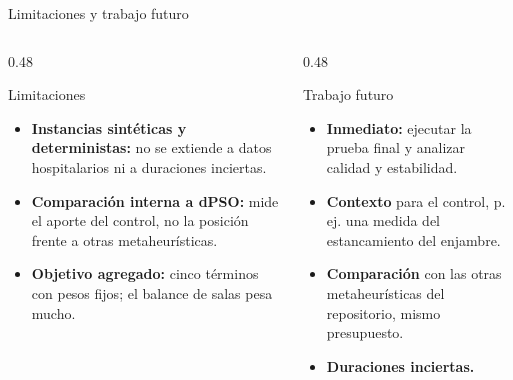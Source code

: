 \documentclass[aspectratio=169,11pt]{beamer}
\begin{document}
\begin{frame}{Limitaciones y trabajo futuro}
  \begin{columns}[t]
    \begin{column}{0.48\textwidth}
      \begin{alertblock}{Limitaciones}
        \small
        \begin{itemize}
          \item \textbf{Instancias sintéticas y deterministas:} no se extiende a datos hospitalarios ni a duraciones inciertas.
          \item \textbf{Comparación interna a dPSO:} mide el aporte del control, no la posición frente a otras metaheurísticas.
          \item \textbf{Objetivo agregado:} cinco términos con pesos fijos; el balance de salas pesa mucho.
        \end{itemize}
      \end{alertblock}
    \end{column}

    \begin{column}{0.48\textwidth}
      \begin{block}{Trabajo futuro}
        \small
        \begin{itemize}
          \item \textbf{Inmediato:} ejecutar la prueba final y analizar calidad y estabilidad.
          \item \textbf{Contexto} para el control, p. ej. una medida del estancamiento del enjambre.
          \item \textbf{Comparación} con las otras metaheurísticas del repositorio, mismo presupuesto.
          \item \textbf{Duraciones inciertas.}
        \end{itemize}
      \end{block}
    \end{column}
  \end{columns}
\end{frame}
\end{document}
